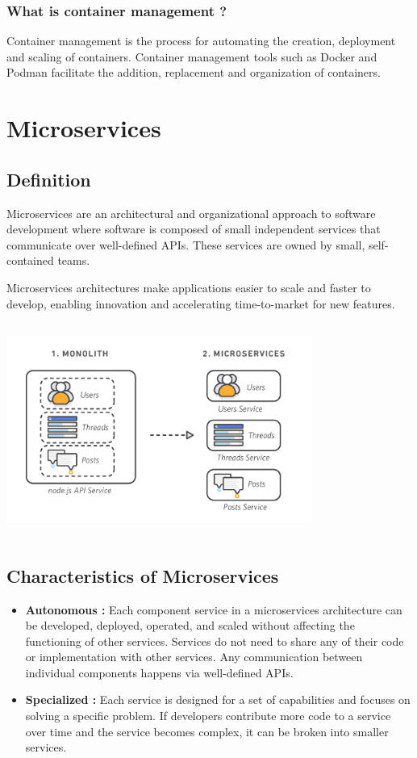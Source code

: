 \subsubsection*{What is container management ?}
Container management is the process for automating the creation, deployment and scaling of containers. Container management tools such as Docker and Podman facilitate the addition, replacement and organization of containers.

\section{Microservices}
\subsection{Definition}
Microservices are an architectural and organizational approach to software development where software is composed of small independent services that communicate over well-defined APIs. These services are owned by small, self-contained teams.

\medskip
Microservices architectures make applications easier to scale and faster to develop, enabling innovation and accelerating time-to-market for new features.
\begin{center}
\includegraphics[width=10cm, height=7cm]{src/assets/images/microservices.png}
\end{center}
\subsection{Characteristics of Microservices}
\begin{itemize}
	\item \textbf{Autonomous :} Each component service in a microservices architecture can be developed, deployed, operated, and scaled without affecting the functioning of other services. Services do not need to share any of their code or implementation with other services. Any communication between individual components happens via well-defined APIs.
	\item \textbf{Specialized :} Each service is designed for a set of capabilities and focuses on solving a specific problem. If developers contribute more code to a service over time and the service becomes complex, it can be broken into smaller services.
\end{itemize}

